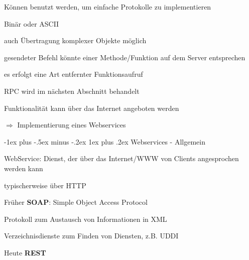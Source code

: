 \documentclass[10pt]{article}
\makeatletter
\renewcommand{\subsubsection}{\@startsection{subsubsection}{3}{0mm}%
                                {-1ex plus -.5ex minus -.2ex}%
                                {1ex plus .2ex}%
                                {\normalfont\small\bfseries}}
\makeatother
\begin{document}
  \begin{itemize*}
    \item Können benutzt werden, um einfache Protokolle zu implementieren
    \item Binär oder ASCII
    \begin{itemize*}
      \item auch Übertragung komplexer Objekte möglich
    \end{itemize*}
    \item gesendeter Befehl könnte einer Methode/Funktion auf dem Server entsprechen
    \begin{itemize*}
      \item es erfolgt eine Art entfernter Funktionsaufruf
      \item RPC wird im nächsten Abschnitt behandelt
    \end{itemize*}
    \item Funktionalität kann über das Internet angeboten werden
    \begin{itemize*}
      \item[$\Rightarrow$] Implementierung eines Webservices
    \end{itemize*}
  \end{itemize*}
  
  \subsubsection{Webservices - Allgemein}
  \begin{itemize*}
    \item WebService: Dienst, der über das Internet/WWW von Clients angesprochen werden kann
    \item typischerweise über HTTP
    \item Früher \textbf{SOAP}: Simple Object Access Protocol
    \begin{itemize*}
      \item Protokoll zum Austausch von Informationen in XML
      \item Verzeichnisdienste zum Finden von Diensten, z.B. UDDI
    \end{itemize*}
    \item Heute \textbf{REST}
  \end{itemize*}
  
\end{document}
